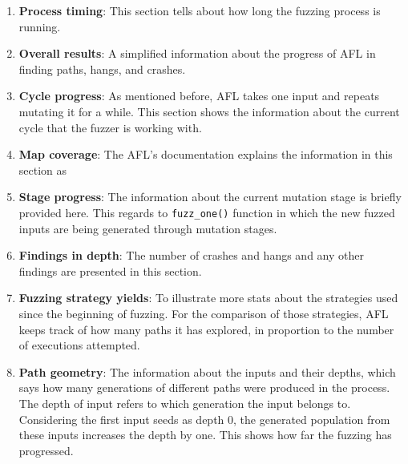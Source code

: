 \begin{enumerate}
    \item \textbf{Process timing}: This section tells about how long the fuzzing process is running.
    
    \item \textbf{Overall results}: A simplified information about the progress of AFL in finding paths, hangs, and crashes. 

    \item \textbf{Cycle progress}: As mentioned before, AFL takes one input and repeats mutating it for a while. This section shows the information about the current cycle that the fuzzer is working with.

    \item \textbf{Map coverage}: The AFL's documentation explains the information in this section as 

    \item \textbf{Stage progress}: The information about the current mutation stage is briefly provided here. This regards to \texttt{fuzz\_one()} function in which the new fuzzed inputs are being generated through mutation stages.

    \item \textbf{Findings in depth}: The number of crashes and hangs and any other findings are presented in this section.

    \item \textbf{Fuzzing strategy yields}: To illustrate more stats about the strategies used since the beginning of fuzzing. For the comparison of those strategies, AFL keeps track of how many paths it has explored, in proportion to the number of executions attempted.

    \item \textbf{Path geometry}: The information about the inputs and their depths, which says how many generations of different paths were produced in the process. The depth of input refers to which generation the input belongs to. Considering the first input seeds as depth 0, the generated population from these inputs increases the depth by one. This shows how far the fuzzing has progressed.
\end{enumerate}

